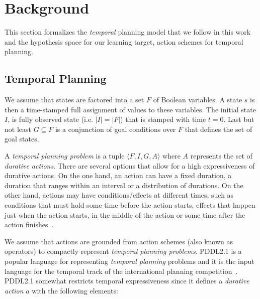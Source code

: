 \documentclass{ecai}
\newcommand{\tup}[1]{{\langle #1 \rangle}}
\begin{document}
\section{Background}
This section formalizes the {\em temporal} planning model that we follow in this work and the hypothesis space for our learning target, action schemes for temporal planning.

\subsection{Temporal Planning}
\label{sec:temporalplanning}

We assume that states are factored into a set $F$ of Boolean variables. A state $s$ is then a time-stamped full assignment of values to these variables. The initial state $I$, is fully observed state (i.e. $|I|=|F|$) that is stamped with time $t=0$. Last but not least $G \subseteq F$ is a conjunction of goal conditions over $F$ that defines the set of goal states.

A {\em temporal planning problem} is a tuple $\tup{F,I,G,A}$ where $A$ represents the set of {\em durative actions}. There are several options that allow for a high expressiveness of durative actions. On the one hand, an action can have a fixed duration, a duration that ranges within an interval or a distribution of durations. On the other hand, actions may have conditions/effects at different times, such as conditions that must hold some time before the action starts, effects that happen just when the action starts, in the middle of the action or some time after the action finishes~\cite{garrido2009constraint}.

We assume that actions are grounded from action schemes (also known as operators) to compactly represent {\em temporal planning problems}.  PDDL2.1 is a popular language for representing {\em temporal planning} problems and it is the input language for the temporal track of the international planning competition~\cite{fox2003pddl2,ghallab2004automated}. PDDL2.1 somewhat restricts temporal expressiveness since it defines a {\em durative action} $a$ with the following elements:
\end{document}

